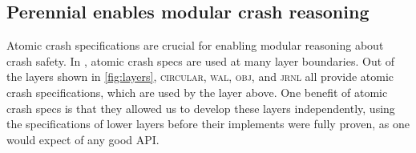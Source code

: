 


\subsection{Perennial enables modular crash reasoning}
\label{sec:eval:modular}

Atomic crash specifications are crucial for enabling modular reasoning
about crash safety.  In \txn, atomic crash specs are used at many
layer boundaries.  Out of the layers shown in \autoref{fig:layers},
\textsc{circular}, \textsc{wal}, \textsc{obj}, and \textsc{jrnl} all
provide atomic crash specifications, which are used by the layer above. One benefit of atomic crash specs is that they
allowed us to develop these layers independently, using the specifications of
lower layers before their implements were fully proven, as one would
expect of any good API.

